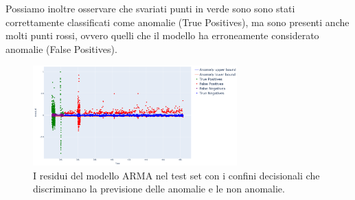     Possiamo inoltre osservare che svariati punti in verde sono sono stati correttamente classificati come anomalie
    (True Positives), ma sono presenti anche molti punti rossi, ovvero quelli che il modello ha erroneamente 
    considerato anomalie (False Positives). 

    \begin{figure}[H]
        \centering
        \includegraphics[width=0.7\textwidth]{./input/chapters/models/figs/arma-residuals.png}
        \caption{I residui del modello ARMA nel test set con i confini decisionali che discriminano la previsione delle 
        anomalie e le non anomalie.}
        \label{fig:residuals}
    \end{figure}